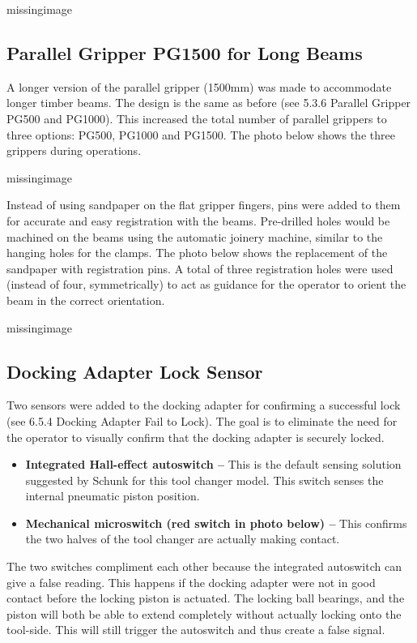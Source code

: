 missingimage

\subsection{Parallel Gripper PG1500 for Long Beams}
\label{subsection:exploration_4_parallel_gripper_pg1500_for_long_beams}

A longer version of the parallel gripper (1500mm) was made to accommodate longer timber beams. The design is the same as before (see 5.3.6 Parallel Gripper PG500 and PG1000). This increased the total number of parallel grippers to three options: PG500, PG1000 and PG1500. The photo below shows the three grippers during operations.

missingimage

Instead of using sandpaper on the flat gripper fingers, pins were added to them for accurate and easy registration with the beams. Pre-drilled holes would be machined on the beams using the automatic joinery machine, similar to the hanging holes for the clamps. The photo below shows the replacement of the sandpaper with registration pins. A total of three registration holes were used (instead of four, symmetrically) to act as guidance for the operator to orient the beam in the correct orientation. 

missingimage

\subsection{Docking Adapter Lock Sensor}
\label{subsection:exploration_4_docking_adapter_lock_sensor}

Two sensors were added to the docking adapter for confirming a successful lock (see 6.5.4 Docking Adapter Fail to Lock). The goal is to eliminate the need for the operator to visually confirm that the docking adapter is securely locked.

\begin{itemize}
    \item \textbf{Integrated Hall-effect autoswitch --} This is the default sensing solution suggested by Schunk for this tool changer model. This switch senses the internal pneumatic piston position.
    \item \textbf{Mechanical microswitch (red switch in photo below) --} This confirms the two halves of the tool changer are actually making contact.
\end{itemize}

The two switches compliment each other because the integrated autoswitch can give a false reading. This happens if the docking adapter were not in good contact before the locking piston is actuated. The locking ball bearings, and the piston will both be able to extend completely without actually locking onto the tool-side. This will still trigger the autoswitch and thus create a false signal. 

